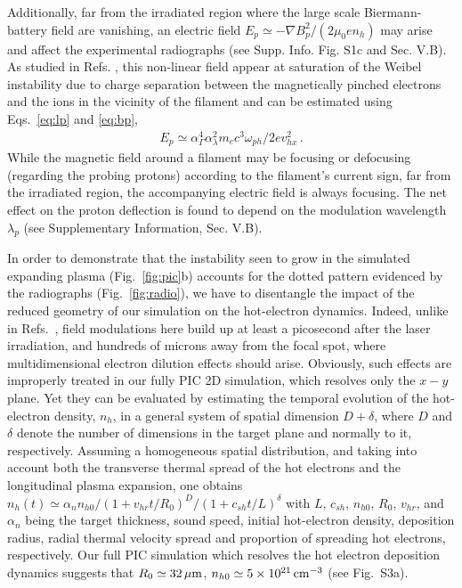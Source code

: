 \documentclass[aps,twocolumn,showpacs,superscriptaddress]{revtex4}
\begin{document}
Additionally, far from the irradiated region where the large scale  Biermann-battery field are vanishing, an electric field
$E_p \simeq - \nabla B_p^2/(2 \mu_0e n_h)$ may arise and affect the experimental radiographs (see Supp. Info. Fig. S1c and Sec. V.B). 
As studied in Refs.  \cite{POP_Dieckmann_2009, POP_Bret_Gremillet_2010}, this non-linear field appear at saturation of the Weibel instability due to  charge separation between the magnetically pinched electrons and the ions in the vicinity of the filament and can be estimated using Eqs.~\eqref{eq:lp} and \eqref{eq:bp},
\begin{align} 
  E_p \simeq \alpha_\Gamma^4  \alpha_\lambda^2 m_ec^3\omega_{ph}/2ev_{hx}^2 \label{eq:ep} \, .
\end{align}
While the magnetic field around a filament may be focusing or defocusing (regarding the probing protons) according to the filament's current sign, far from the irradiated region,  the accompanying electric field is always focusing. The net effect on the proton deflection is found to depend on the modulation wavelength $\lambda_p$ (see Supplementary Information, Sec. V.B).

In order to demonstrate that the instability seen to grow in the simulated expanding plasma (Fig.~\ref{fig:pic}b) accounts for the dotted pattern evidenced by the radiographs (Fig.~\ref{fig:radio}), we have to disentangle the impact of the reduced geometry of our simulation on the hot-electron dynamics. Indeed, unlike in Refs.~\cite{PRL_Gode_2017, NJP_Scott_2017}, field modulations here build up at least a picosecond after the laser irradiation, and hundreds of microns away from the focal spot, where multidimensional electron dilution effects should arise. Obviously, such effects are improperly treated in our fully PIC 2D simulation, which resolves only the $x-y$ plane. Yet they can be evaluated by estimating the temporal evolution of the hot-electron density, $n_h$, in a general system of spatial dimension $D+\delta$, where $D$ and $\delta$ denote the number of dimensions in the target plane and normally to it, respectively. Assuming a homogeneous spatial distribution, and taking into account both the transverse thermal spread of the hot electrons and the longitudinal plasma expansion, one obtains $n_h(t) \simeq \alpha_n n_{h0}/(1+ v_{hr}   t /R_{0})^D/(1+c_{sh} t/L)^\delta$ with $L$, $c_{sh}$, $n_{h0}$, $R_{0}$, $v_{hr}$, and $\alpha_n$ being the target thickness, sound speed, initial hot-electron density,  deposition radius, radial thermal velocity spread and proportion of spreading hot electrons, respectively.
Our full PIC simulation which resolves the hot electron deposition dynamics suggests that $R_{0} \simeq 32\,\rm \mu m$, $n_{h0} \simeq 5\times 10^{21}\,\rm cm^{-3}$ (see Fig.~S3a).
\end{document}
